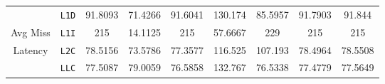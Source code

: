 \documentclass[11pt, swedish, openany]{book}
\begin{document}
\begin{table}[H]
\begin{tabular}{||c|c||c||c|c||c|c||c|c||}
        \hline
                                            & \texttt{L1D} & 91.8093                   & 71.4266  & 91.6041     & 130.174  & 85.5957  & 91.7903  & 91.844   \\
        Avg Miss                            & \texttt{L1I} & 215                       & 14.1125  & 215         & 57.6667  & 229      & 215      & 215      \\
        Latency                             & \texttt{L2C} & 78.5156                   & 73.5786  & 77.3577     & 116.525  & 107.193  & 78.4964  & 78.5508  \\
                                            & \texttt{LLC} & 77.5087                   & 79.0059  & 76.5858     & 132.767  & 76.5338  & 77.4779  & 77.5649  \\
        \hline
    \end{tabular}
\end{table}
\end{document}
